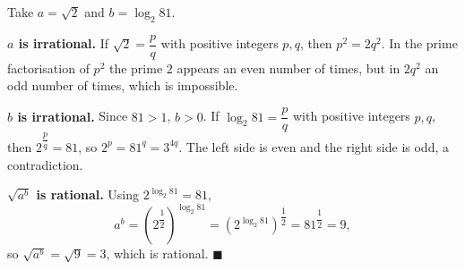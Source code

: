 Take $a=\sqrt2$ and $b=\log_2 81$.

\textbf{$a$ is irrational.} If $\sqrt2=\dfrac pq$ with positive integers $p,q$, then $p^2=2q^2$. In the prime factorisation of $p^2$ the prime $2$ appears an even number of times, but in $2q^2$ an odd number of times, which is impossible.

\textbf{$b$ is irrational.} Since $81>1$, $b>0$. If $\log_2 81=\dfrac pq$ with positive integers $p,q$, then $2^{\dfrac pq}=81$, so $2^p=81^q=3^{4q}$. The left side is even and the right side is odd, a contradiction.

\textbf{$\sqrt{a^b}$ is rational.} Using $2^{\log_2 81}=81$,
\[a^b=\left(2^{\dfrac12}\right)^{\log_2 81}=\left(2^{\log_2 81}\right)^{\dfrac12}=81^{\dfrac12}=9,\]
so $\sqrt{a^b}=\sqrt9=3$, which is rational. $\blacksquare$
